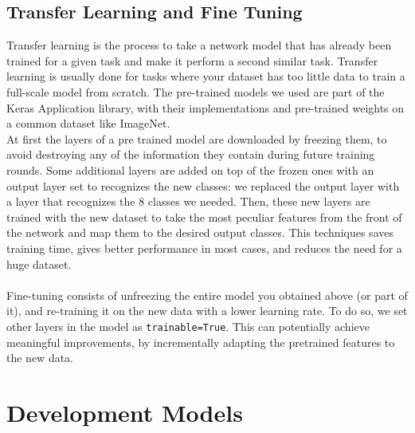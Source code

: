\documentclass[11pt, oneside]{article}
\begin{document}
\subsection{Transfer Learning and Fine Tuning}
Transfer learning is the process to take a network model that has already been trained for a given task and make it perform a second similar task. Transfer learning is usually done for tasks where your dataset has too little data to train a full-scale model from scratch. The pre-trained models we used are part of the Keras Application library, with their implementations and pre-trained weights on a common dataset like ImageNet. \\
At first the layers of a pre trained model are downloaded by freezing them, to avoid destroying any of the information they contain during future training rounds. Some additional layers are added on top of the frozen ones with an output layer set to recognizes the new classes: we replaced the output layer with a layer that recognizes the 8 classes we needed.
Then, these new layers are trained with the new dataset to take the most peculiar features from the front of the network and map them to the desired output classes. This techniques saves training time, gives better performance in most cases, and reduces the need for a huge dataset. \\\\
Fine-tuning consists of unfreezing the entire model you obtained above (or part of it), and re-training it on the new data with a lower learning rate. To do so, we set other layers in the model as \texttt{trainable=True}. This can potentially achieve meaningful improvements, by incrementally adapting the pretrained features to the new data.
\section{Development Models}
\end{document}
